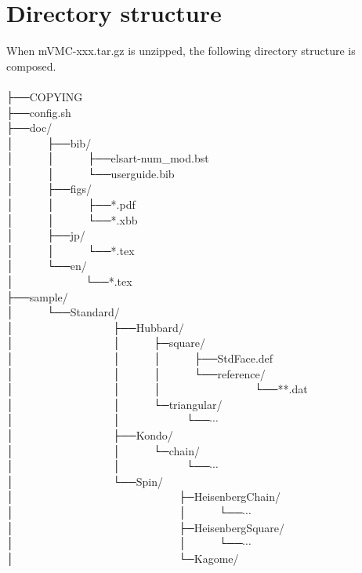 \section{Directory structure}
When mVMC-xxx.tar.gz is unzipped, the following directory structure is composed.\\
\\
├──COPYING\\
├──config.sh\\
├──doc/\\
│~~~~~~├──bib/\\
│~~~~~~│~~~~~~├──elsart-num\_mod.bst\\
│~~~~~~│~~~~~~└──userguide.bib\\
│~~~~~~├──figs/\\
│~~~~~~│~~~~~~├──*.pdf\\
│~~~~~~│~~~~~~└──*.xbb\\
│~~~~~~├──jp/\\
│~~~~~~│~~~~~~└──*.tex\\
│~~~~~~└──en/\\
│~~~~~~~~~~~~~└──*.tex\\
├──sample/\\
│~~~~~~└──Standard/\\
│~~~~~~~~~~~~~~~~~~├──Hubbard/\\
│~~~~~~~~~~~~~~~~~~│~~~~~~├─square/\\
│~~~~~~~~~~~~~~~~~~│~~~~~~│~~~~~~├──StdFace.def\\
│~~~~~~~~~~~~~~~~~~│~~~~~~│~~~~~~└──reference/\\
│~~~~~~~~~~~~~~~~~~│~~~~~~│~~~~~~~~~~~~~~~~~└──**.dat\\
│~~~~~~~~~~~~~~~~~~│~~~~~~└─triangular/\\
│~~~~~~~~~~~~~~~~~~│~~~~~~~~~~~~└──$\cdots$\\
│~~~~~~~~~~~~~~~~~~├──Kondo/\\
│~~~~~~~~~~~~~~~~~~│~~~~~~└─chain/\\
│~~~~~~~~~~~~~~~~~~│~~~~~~~~~~~~└──$\cdots$\\
│~~~~~~~~~~~~~~~~~~└──Spin/\\
│~~~~~~~~~~~~~~~~~~~~~~~~~~~~~~├─HeisenbergChain/\\
│~~~~~~~~~~~~~~~~~~~~~~~~~~~~~~│~~~~~~└──$\cdots$\\
│~~~~~~~~~~~~~~~~~~~~~~~~~~~~~~├─HeisenbergSquare/\\
│~~~~~~~~~~~~~~~~~~~~~~~~~~~~~~│~~~~~~└──$\cdots$\\
│~~~~~~~~~~~~~~~~~~~~~~~~~~~~~~└─Kagome/\\
